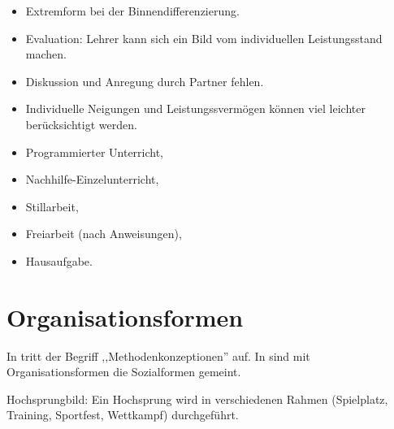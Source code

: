 \begin{itemize}
\item Extremform bei der Binnendifferenzierung.
\item Evaluation: Lehrer kann sich ein Bild vom individuellen
Leistungsstand  machen.
\item Diskussion und Anregung durch Partner fehlen.
\item Individuelle Neigungen und Leistungssverm\"{o}gen k\"{o}nnen viel
leichter ber\"{u}cksichtigt werden.
\end{itemize}

\begin{beisp}
	\begin{itemize}
		\item Programmierter Unterricht,
		\item Nachhilfe-Einzelunterricht,
		\item Stillarbeit, 
		\item Freiarbeit (nach Anweisungen),
		\item Hausaufgabe.
	\end{itemize}
\end{beisp}

\bip\bip
\section{Organisationsformen}\label{Orga}

In \cite[S.\ 97]{DuitHausslerKircher} tritt der Begriff
,,Methodenkonzeptionen'' auf.
In \cite{BleichrothDahnckeJung} sind mit Organisationsformen
die Sozialformen gemeint.

\mip Hochsprungbild: Ein Hochsprung wird in verschiedenen
Rahmen (Spielplatz, Training, Sportfest, Wettkampf) durchgef\"{u}hrt.


